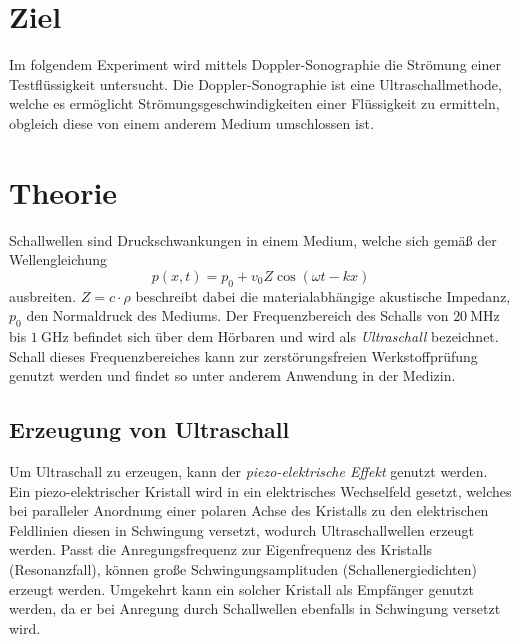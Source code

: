 \section{Ziel}
\label{sec:Ziel}
Im folgendem Experiment wird mittels Doppler-Sonographie die Strömung einer Testflüssigkeit untersucht. Die Doppler-Sonographie ist eine Ultraschallmethode, welche es ermöglicht
Strömungsgeschwindigkeiten einer Flüssigkeit zu ermitteln, obgleich diese von einem anderem Medium umschlossen ist.   
\section{Theorie}
\label{sec:Theorie}
Schallwellen sind Druckschwankungen in einem Medium, welche sich gemäß der Wellengleichung
\begin{equation*}
    \label{eqn:Schallwelle}
    p(x,t) = p_0 + v_0 Z \cos \left(\omega t - kx\right)
\end{equation*}
ausbreiten. $Z = c \cdot \rho$ beschreibt dabei die materialabhängige akustische Impedanz, $p_0$ den Normaldruck des Mediums.
Der Frequenzbereich des Schalls von $\qty{20}{\mega\hertz}$ bis $\qty{1}{\giga\hertz}$ befindet sich über dem Hörbaren und wird als \textit{Ultraschall} bezeichnet.
Schall dieses Frequenzbereiches kann zur zerstörungsfreien Werkstoffprüfung genutzt werden und findet so unter anderem Anwendung in der Medizin. \\

\subsection{Erzeugung von Ultraschall}
\label{subsec:Erzeugung}
Um Ultraschall zu erzeugen, kann der \textit{piezo-elektrische Effekt} genutzt werden. Ein piezo-elektrischer Kristall wird in ein elektrisches Wechselfeld gesetzt,
welches bei paralleler Anordnung einer polaren Achse des Kristalls zu den elektrischen Feldlinien diesen in Schwingung versetzt, wodurch Ultraschallwellen erzeugt werden. 
Passt die Anregungsfrequenz zur Eigenfrequenz des Kristalls (Resonanzfall), können große Schwingungsamplituden (Schallenergiedichten) erzeugt werden. 
Umgekehrt kann ein solcher Kristall als Empfänger genutzt werden, da er bei Anregung durch Schallwellen ebenfalls in Schwingung versetzt wird. \\

